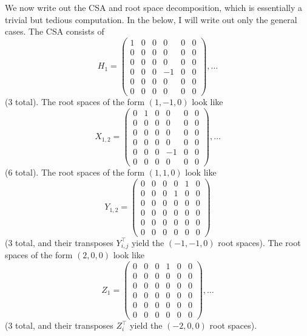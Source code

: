 \documentclass[11pt, headheight=30pt]{scrartcl}
\begin{document}
We now write out the CSA and root space decomposition, which is essentially a trivial but tedious computation. In the below, I will write out only the general cases. The CSA consists of
\[
    H_1 = \left(
        \begin{array}{ccc|ccc}
            1 & 0 & 0 & 0 & 0 & 0 \\
            0 & 0 & 0 & 0 & 0 & 0 \\
            0 & 0 & 0 & 0 & 0 & 0 \\
            \hline
            0 & 0 & 0 & -1 & 0 & 0 \\
            0 & 0 & 0 & 0 & 0 & 0 \\
            0 & 0 & 0 & 0 & 0 & 0    
        \end{array}
    \right), \dots
\]
(3 total). The root spaces of the form $(1,-1,0)$ look like
\[
    X_{1,2} = \left(
        \begin{array}{ccc|ccc}
            0 & 1 & 0 & 0 & 0 & 0 \\
            0 & 0 & 0 & 0 & 0 & 0 \\
            0 & 0 & 0 & 0 & 0 & 0 \\
            \hline
            0 & 0 & 0 & 0 & 0 & 0 \\
            0 & 0 & 0 & -1 & 0 & 0 \\
            0 & 0 & 0 & 0 & 0 & 0    
        \end{array}
    \right), \dots
\]
(6 total). The root spaces of the form $(1,1,0)$ look like
\[
    Y_{1,2} = \left(
        \begin{array}{ccc|ccc}
            0 & 0 & 0 & 0 & 1 & 0 \\
            0 & 0 & 0 & 1 & 0 & 0 \\
            0 & 0 & 0 & 0 & 0 & 0 \\
            \hline
            0 & 0 & 0 & 0 & 0 & 0 \\
            0 & 0 & 0 & 0 & 0 & 0 \\
            0 & 0 & 0 & 0 & 0 & 0    
        \end{array}
    \right)
\]
(3 total, and their transposes $Y^\top_{i,j}$ yield the $(-1,-1,0)$ root spaces). The root spaces of the form $(2,0,0)$ look like
\[
    Z_1 = \left(
        \begin{array}{ccc|ccc}
            0 & 0 & 0 & 1 & 0 & 0 \\
            0 & 0 & 0 & 0 & 0 & 0 \\
            0 & 0 & 0 & 0 & 0 & 0 \\
            \hline
            0 & 0 & 0 & 0 & 0 & 0 \\
            0 & 0 & 0 & 0 & 0 & 0 \\
            0 & 0 & 0 & 0 & 0 & 0
        \end{array}
    \right), \dots
\]
(3 total, and their transposes $Z^\top_i$ yield the $(-2,0,0)$ root spaces).
\end{document}
